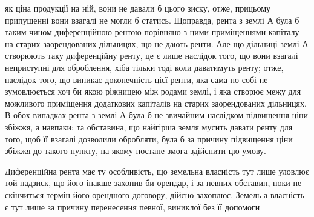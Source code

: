 як ціна продукції на ній, вони не давали б цього зиску, отже, прицьому
припущенні вони взагалі не могли б статись. Щоправда, рента з землі
А була б таким чином диференційною рентою порівняно з цими приміщеннями
капіталу на старих заорендованих дільницях, що не дають ренти. Але
що дільниці землі А створюють таку диференційну ренту, це є лише наслідок
того, що вони взагалі неприступні для оброблення, хіба тільки тоді коли
даватимуть ренту; отже, наслідок того, що виникає доконечність цієї ренти, яка
сама по собі не зумовлюється хоч би якою ріжницею між родами землі, і яка
створює межу для можливого приміщення додаткових капіталів на старих заорендованих
дільницях. В обох випадках рента з землі А була б не звичайним
наслідком підвищення ціни збіжжя, а навпаки: та обставина, що найгірша
земля мусить давати ренту для того, щоб її взагалі дозволили обробляти, була б
за причину підвищення ціни збіжжя до такого пункту, на якому постане змога
здійснити цю умову.

Диференційна рента має ту особливість, що земельна власність тут лише
уловлює той надзиск, що його інакше захопив би орендар, і за певних обставин,
поки не скінчиться термін його орендного договору, дійсно захоплює. Земель а
власність є тут лише за причину перенесення певної, виниклої без її допомоги
